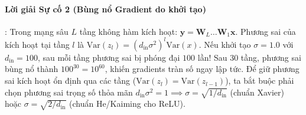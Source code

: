 \paragraph{Lời giải Sự cố 2 (Bùng nổ Gradient do khởi tạo)}:
Trong mạng sâu $L$ tầng không hàm kích hoạt: $\mathbf{y} = \mathbf{W}_L \dots \mathbf{W}_1 \mathbf{x}$. Phương sai của kích hoạt tại tầng $l$ là $\text{Var}(z_l) = (d_{\text{in}} \sigma^2)^l \text{Var}(x)$.
Nếu khởi tạo $\sigma = 1.0$ với $d_{\text{in}} = 100$, sau mỗi tầng phương sai bị phóng đại $100$ lần! Sau 30 tầng, phương sai bùng nổ thành $100^{30} = 10^{60}$, khiến gradients tràn số ngay lập tức.
Để giữ phương sai kích hoạt ổn định qua các tầng ($\text{Var}(z_l) = \text{Var}(z_{l-1})$), ta bắt buộc phải chọn phương sai trọng số thỏa mãn $d_{\text{in}} \sigma^2 = 1 \implies \sigma = \sqrt{1/d_{\text{in}}}$ (chuẩn Xavier) hoặc $\sigma = \sqrt{2/d_{\text{in}}}$ (chuẩn He/Kaiming cho ReLU).
